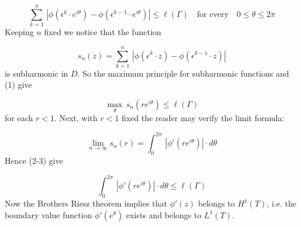 \[
\sum_{k=1}^n\, |\phi(\epsilon^k\cdot e^{i\theta})-\phi(\epsilon^{k-1}
\cdot e^{i\theta})|\leq \ell(\Gamma)\quad\text{for every}
\quad
 0\leq\theta\leq 2\pi\tag{1}
\] 
Keeping $n$ fixed we notice that the function

\[ 
s_n(z)=\sum_{k=1}^n\, |\phi(\epsilon^k\cdot z)-\phi(\epsilon^{k-1}\cdot z)|
\] 
is subharmonic in $D$. So the maximum principle for subharmonic functions
and (1) give

\[
\max_\theta\, s_n(re^{i\theta})\leq \ell(\Gamma)\tag{2}
\] 
for each $r<1$.
Next,
with $r<1$ fixed
the reader may verify the limit formula:

\[
\lim_{n\to\infty}s_n(r)=
\int_0^{2\pi}\, |\phi'(re^{i\theta})|\cdot d\theta\tag{3}
\]
Hence (2-3) give

\[
\int_0^{2\pi}\, |\phi'(re^{i\theta})|\cdot d\theta\leq \ell(\Gamma)
\] 
Now the Brothers Riesz  theorem implies that
$\phi'(z)$ belongs to $H^1(T)$, i.e.
the boundary value function $\phi'(e^{\theta})$ exists and belongs to $L^1(T)$.




%
